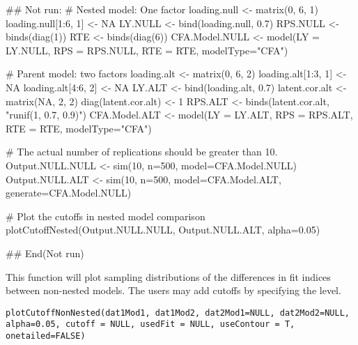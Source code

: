 \documentclass[a4paper]{book}
\begin{document}
\begin{Examples}
\begin{ExampleCode}
## Not run: 
# Nested model: One factor
loading.null <- matrix(0, 6, 1)
loading.null[1:6, 1] <- NA
LY.NULL <- bind(loading.null, 0.7)
RPS.NULL <- binds(diag(1))
RTE <- binds(diag(6))
CFA.Model.NULL <- model(LY = LY.NULL, RPS = RPS.NULL, RTE = RTE, modelType="CFA")

# Parent model: two factors
loading.alt <- matrix(0, 6, 2)
loading.alt[1:3, 1] <- NA
loading.alt[4:6, 2] <- NA
LY.ALT <- bind(loading.alt, 0.7)
latent.cor.alt <- matrix(NA, 2, 2)
diag(latent.cor.alt) <- 1
RPS.ALT <- binds(latent.cor.alt, "runif(1, 0.7, 0.9)")
CFA.Model.ALT <- model(LY = LY.ALT, RPS = RPS.ALT, RTE = RTE, modelType="CFA")

# The actual number of replications should be greater than 10.
Output.NULL.NULL <- sim(10, n=500, model=CFA.Model.NULL) 
Output.NULL.ALT <- sim(10, n=500, model=CFA.Model.ALT, generate=CFA.Model.NULL)

# Plot the cutoffs in nested model comparison
plotCutoffNested(Output.NULL.NULL, Output.NULL.ALT, alpha=0.05)

## End(Not run)
\end{ExampleCode}
\end{Examples}
%
\begin{Description}\relax
This function will plot sampling distributions of the differences in fit indices between non-nested models. The users may add cutoffs by specifying the  level.
\end{Description}
%
\begin{Usage}
\begin{verbatim}
plotCutoffNonNested(dat1Mod1, dat1Mod2, dat2Mod1=NULL, dat2Mod2=NULL, 
alpha=0.05, cutoff = NULL, usedFit = NULL, useContour = T, onetailed=FALSE)
\end{verbatim}
\end{Usage}
%
\end{document}
